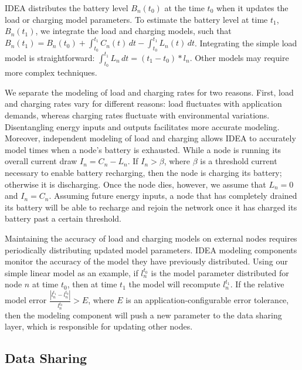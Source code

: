 IDEA distributes the battery level $B_n(t_0)$ at the time $t_0$ when it
updates the load or charging model parameters. To estimate the battery level
at time $t_1$, $B_n(t_1)$, we integrate the load and charging models, such
that $B_n(t_1) = B_n(t_0) + \int_{t_0}^{t_1} \! C_n(t) \, dt -
\int_{t_0}^{t_1} \! L_n(t) \, dt$. Integrating the simple load model is
straightforward: $\int_{t_0}^{t_1} \!  L_n \, dt = \left( t_1 - t_0 \right) *
l_n$. Other models may require more complex techniques.

We separate the modeling of load and charging rates for two reasons. First,
load and charging rates vary for different reasons: load fluctuates with
application demands, whereas charging rates fluctuate with environmental
variations. Disentangling energy inputs and outputs facilitates more accurate
modeling. Moreover, independent modeling of load and charging allows IDEA to
accurately model times when a node's battery is exhausted. While a node is
running its overall current draw $I_n = C_n - L_n$. If $I_n > \beta$, where
$\beta$ is a threshold current necessary to enable battery recharging, then
the node is charging its battery; otherwise it is discharging. Once the node
dies, however, we assume that $L_n = 0$ and $I_n = C_n$. Assuming future
energy inputs, a node that has completely drained its battery will be able to
recharge and rejoin the network once it has charged its battery past a
certain threshold.

Maintaining the accuracy of load and charging models on external nodes
requires periodically distributing updated model parameters. IDEA modeling
components monitor the accuracy of the model they have previously
distributed. Using our simple linear model as an example, if $l_n^{t_0}$ is
the model parameter distributed for node $n$ at time $t_0$, then at time
$t_1$ the model will recompute $l_n^{t_1}$. If the relative model error
$\frac{\left| l_n^{t_1} - l_n^{t_0} \right|}{l_n^{t_0}} > E$, where $E$ is an
application-configurable error tolerance, then the modeling component will
push a new parameter to the data sharing layer, which is responsible for
updating other nodes. 

\subsection{Data Sharing}

